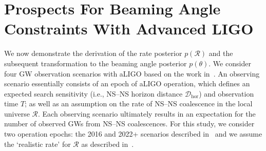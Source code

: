 \documentclass[twocolumn,nofootinbib]{revtex4-1}
\newcommand{\cbcrate}{{{\mathcal R}}}
\newcommand{\dhor}{\ensuremath{{\mathcal D}_{\mathrm{hor}}}}
\newcommand{\BNS}{\ac{NS}--\ac{NS}\xspace}
\begin{document}
\section{Prospects For Beaming Angle Constraints With Advanced LIGO}
We now demonstrate the derivation of the rate posterior $p(\cbcrate)$
and the subsequent transformation to the beaming angle posterior
$p(\theta)$.  We consider four \ac{GW} observation scenarios with
\ac{aLIGO} based on the work in~\cite{Aasi:2013wya}.  An observing
scenario essentially consists of an epoch of \ac{aLIGO} operation,
which defines an expected search sensitivity (i.e., \BNS{} horizon
distance $\dhor$) and observation time $T$; as well as an assumption
on the rate of \BNS{} coalescence in the local universe $\cbcrate$.
Each observing scenario ultimately results in an expectation for the
number of observed \acp{GW} from \BNS coalescences.  For this study,
we consider two operation epochs: the 2016 and 2022+ scenarios
described in~\cite{Aasi:2013wya} and we assume the `realistic rate'
for $\cbcrate$ as described in~\cite{rates_paper}.
\end{document}
